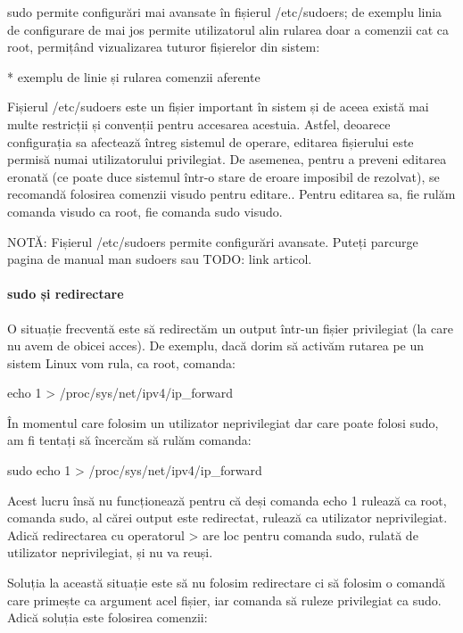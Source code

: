 sudo permite configurări mai avansate în fișierul /etc/sudoers; de exemplu linia
de configurare de mai jos permite utilizatorul alin rularea doar a comenzii cat
ca root, permițând vizualizarea tuturor fișierelor din sistem:

* exemplu de linie și rularea comenzii aferente

Fișierul /etc/sudoers este un fișier important în sistem și de aceea există mai
multe restricții și convenții pentru accesarea acestuia. Astfel, deoarece
configurația sa afectează întreg sistemul de operare, editarea fișierului este
permisă numai utilizatorului privilegiat. De asemenea, pentru a preveni editarea
eronată (ce poate duce sistemul într-o stare de eroare imposibil de rezolvat),
se recomandă folosirea comenzii visudo pentru editare.. Pentru editarea sa, fie
rulăm comanda visudo ca root, fie comanda sudo visudo.

NOTĂ: Fișierul /etc/sudoers permite configurări avansate. Puteți parcurge pagina
de manual man sudoers sau TODO: link articol.

\paragraph{sudo și redirectare}

O situație frecventă este să redirectăm un output într-un fișier privilegiat (la
care nu avem de obicei acces). De exemplu, dacă dorim să activăm rutarea pe un
sistem Linux vom rula, ca root, comanda:

\begin{screen}
echo 1 > /proc/sys/net/ipv4/ip_forward
\end{screen}

În momentul care folosim un utilizator neprivilegiat dar care poate folosi sudo,
am fi tentați să încercăm să rulăm comanda:

\begin{screen}
sudo echo 1 > /proc/sys/net/ipv4/ip_forward
\end{screen}

Acest lucru însă nu funcționează pentru că deși comanda echo 1 rulează ca root,
comanda sudo, al cărei output este redirectat, rulează ca utilizator
neprivilegiat. Adică redirectarea cu operatorul > are loc pentru comanda sudo,
rulată de utilizator neprivilegiat, și nu va reuși.

Soluția la această situație este să nu folosim redirectare ci să folosim o
comandă care primește ca argument acel fișier, iar comanda să ruleze privilegiat
ca sudo. Adică soluția este folosirea comenzii:

